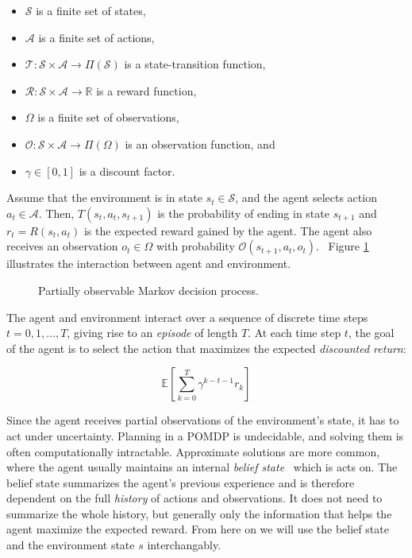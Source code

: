 \begin{itemize}
    \item \(\mathcal{S}\) is a finite set of states,
    \item \(\mathcal{A}\) is a finite set of actions,
    \item \(\mathcal{T}: \mathcal{S} \times \mathcal{A} \rightarrow \Pi(\mathcal{S})\) is a state-transition function,
    \item \(\mathcal{R}: \mathcal{S} \times \mathcal{A} \rightarrow \mathbb{R}\) is a reward function,
    \item \(\Omega\) is a finite set of observations,
    \item \(\mathcal{O}: \mathcal{S} \times \mathcal{A} \rightarrow \Pi(\Omega)\) is an observation function, and
    \item \(\gamma \in [0, 1]\) is a discount factor.
\end{itemize}

Assume that the environment is in state \(s_t \in \mathcal{S}\), and the agent selects action \(a_t \in \mathcal{A}\).
Then, \(T(s_t, a_t, s_{t+1})\) is the probability of ending in state \(s_{t+1}\) and \(r_t = R(s_t, a_t)\) is the expected reward gained by the agent.
The agent also receives an observation \(o_t \in \Omega\) with probability \(\mathcal{O}(s_{t+1}, a_t, o_t)\).~\cite{kaelbling_pomdp_1998}
Figure \ref{fig:pomdp} illustrates the interaction between agent and environment.

\begin{figure}
    \centering
    
    \label{fig:pomdp}
    \caption[Partially observable Markov decision process]{Partially observable Markov decision process.}
\end{figure}

The agent and environment interact over a sequence of discrete time steps \(t = 0, 1, \dots, T\), giving rise to an \textit{episode} of length \(T\).
At each time step \(t\), the goal of the agent is to select the action that maximizes the expected \textit{discounted return}:

\[ 
    \mathbb{E} \left[ \sum_{k=0}^T \gamma^{k-t-1} r_k \right]
\]

Since the agent receives partial observations of the environment's state, it has to act under uncertainty.
Planning in a POMDP is undecidable, and solving them is often computationally intractable.
Approximate solutions are more common, where the agent usually maintains an internal \textit{belief state}~\cite{kaelbling_pomdp_1998} which is acts on.
The belief state summarizes the agent's previous experience and is therefore dependent on the full \textit{history} of actions and observations.
It does not need to summarize the whole history, but generally only the information that helps the agent maximize the expected reward.
From here on we will use the belief state and the environment state \(s\) interchangably. 


